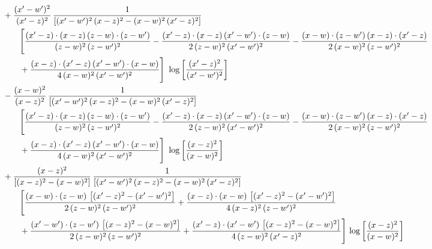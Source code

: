 \documentclass[10pt]{article}
\numberwithin{equation}{section}
\begin{document}
\begin{align}
&\qquad+\frac{(x^{\prime}-w^{\prime})^{2}}{(x^{\prime}-z)^{2}}\, \frac{1}{\left[(x^{\prime}-w^{\prime})^{2}\, (x-z)^{2} - (x-w)^{2}\, (x^{\prime}-z)^{2}\right]} \notag\\&\qquad\qquad  \Bigg[\frac{(x^{\prime}-z)\cdot (x-z)\, (z-w)\cdot (z-w^{\prime})}{(z-w)^{2}\, (z-w^{\prime})^{2}}-\frac{(x^{\prime}-z)\cdot (x-z)\, (x^{\prime}-w^{\prime})\cdot (z-w)}{2\, (z-w)^{2}\, (x^{\prime}-w^{\prime})^{2}} -\frac{(x-w)\cdot (z-w^{\prime})\, (x-z)\cdot (x^{\prime}-z)}{2\, (x-w)^{2}\, (z-w^{\prime})^{2}}\notag\\&\qquad\qquad  +\frac{(x-z)\cdot (x^{\prime}-z)\, (x^{\prime}-w^{\prime})\cdot (x-w)}{4\, (x-w)^{2}\, (x^{\prime}-w^{\prime})^{2}}\Bigg]\,\, \log{\left[\frac{(x^{\prime}-z)^{2}}{(x^{\prime}-w^{\prime})^{2}}\right]}\notag\\
&\qquad-\frac{(x-w)^{2}}{(x-z)^{2}}\, \frac{1}{\left[(x^{\prime}-w^{\prime})^{2}\, (x-z)^{2} - (x-w)^{2}\, (x^{\prime}-z)^{2}\right]} \notag\\&\qquad\qquad  \Bigg[\frac{(x^{\prime}-z)\cdot (x-z)\, (z-w)\cdot (z-w^{\prime})}{(z-w)^{2}\, (z-w^{\prime})^{2}}-\frac{(x^{\prime}-z)\cdot (x-z)\, (x^{\prime}-w^{\prime})\cdot (z-w)}{2\, (z-w)^{2}\, (x^{\prime}-w^{\prime})^{2}} -\frac{(x-w)\cdot (z-w^{\prime})\, (x-z)\cdot (x^{\prime}-z)}{2\, (x-w)^{2}\, (z-w^{\prime})^{2}}\notag\\&\qquad\qquad  +\frac{(x-z)\cdot (x^{\prime}-z)\, (x^{\prime}-w^{\prime})\cdot (x-w)}{4\, (x-w)^{2}\, (x^{\prime}-w^{\prime})^{2}}\Bigg]\,\, \log{\left[\frac{(x-z)^{2}}{(x-w)^{2}}\right]}\notag\\
&\qquad+\frac{(x-z)^{2}}{\left[(x-z)^{2}-(x-w)^{2}\right]}\,\frac{1}{\left[(x^{\prime}-w^{\prime})^{2}\,(x-z)^{2} - (x-w)^{2}\,(x^{\prime}-z)^{2}\right]}\notag\\&\qquad\qquad  \Bigg[\frac{(x-w)\cdot (z-w)\, \left[(x^{\prime}-z)^{2}-(x^{\prime}-w^{\prime})^{2}\right]}{2\, (z-w)^{2}\, (z-w^{\prime})^{2}}  + \frac{(x-z)\cdot (x-w)\,\left[(x^{\prime}-z)^{2}-(x^{\prime}-w^{\prime})^{2}\right] }{4\,(x-z)^{2}\,(z-w^{\prime})^{2}}\notag\\&\qquad\qquad  +\frac{(x^{\prime}-w^{\prime})\cdot (z-w^{\prime})\, \left[(x-z)^{2}-(x-w)^{2}\right]}{2\, (z-w)^{2}\, (z-w^{\prime})^{2}}+ \frac{(x^{\prime}-z)\cdot (x^{\prime}-w^{\prime})\, \left[(x-z)^{2}-(x-w)^{2}\right]}{4\, (z-w)^{2}\,(x^{\prime}-z)^{2}}\Bigg]\, \log{\left[\frac{(x-z)^{2}}{(x-w)^{2}}\right]}\notag\\

\end{align}
\end{document}
